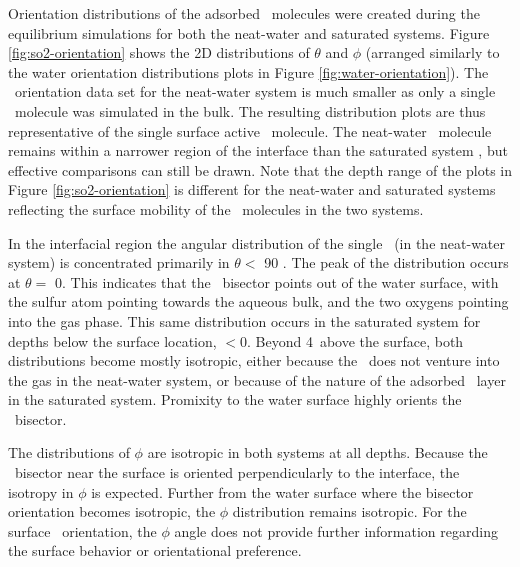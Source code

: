 Orientation distributions of the adsorbed \suldiox~molecules were created during the equilibrium simulations for both the neat-water and saturated systems. Figure \ref{fig:so2-orientation} shows the 2D distributions of $\theta$ and $\phi$ (arranged similarly to the water orientation distributions plots in Figure \ref{fig:water-orientation}). The \suldiox~orientation data set for the neat-water system is much smaller as only a single \suldiox~molecule was simulated in the bulk. The resulting distribution plots are thus representative of the single surface active \suldiox~molecule. The neat-water \suldiox~molecule remains within a narrower region of the interface than the saturated system \suldiox, but effective comparisons can still be drawn. Note that the depth range of the plots in Figure \ref{fig:so2-orientation} is different for the neat-water and saturated systems reflecting the surface mobility of the \suldiox~molecules in the two systems.

In the interfacial region the angular distribution of the single \suldiox~(in the neat-water system) is concentrated primarily in $\theta <$ 90 \textdegree. The peak of the distribution occurs at $\theta=$ 0\textdegree. This indicates that the \suldiox~bisector points out of the water surface, with the sulfur atom pointing towards the aqueous bulk, and the two oxygens pointing into the gas phase. This same distribution occurs in the saturated system for depths below the surface location, $< 0$\angs. Beyond 4\angs~above the surface, both distributions become mostly isotropic, either because the \suldiox~does not venture into the gas in the neat-water system, or because of the nature of the adsorbed \suldiox~layer in the saturated system. Promixity to the water surface highly orients the \suldiox~bisector. %

The distributions of $\phi$ are isotropic in both systems at all depths. Because the \suldiox~bisector near the surface is oriented perpendicularly to the interface, the isotropy in $\phi$ is expected. Further from the water surface where the bisector orientation becomes isotropic, the $\phi$ distribution remains isotropic. For the surface \suldiox~orientation, the $\phi$ angle does not provide further information regarding the surface behavior or orientational preference.

